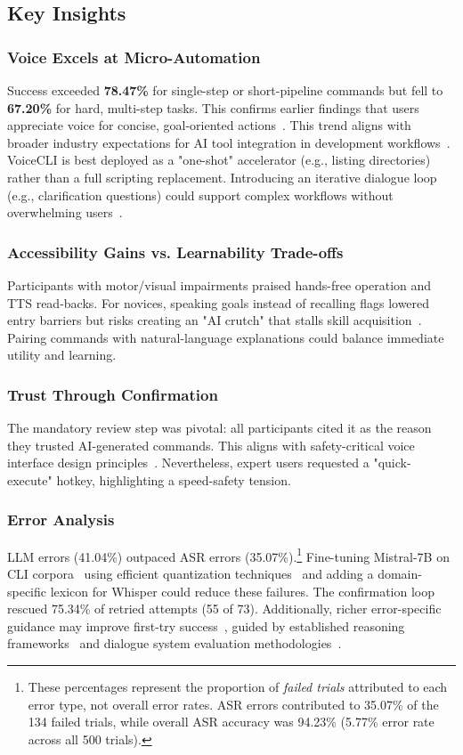 \documentclass[a4paper,12pt]{article}
\begin{document}
\subsection{Key Insights}

\subsubsection{Voice Excels at Micro-Automation}  
Success exceeded \textbf{78.47\%} for single-step or short-pipeline commands but fell to \textbf{67.20\%} for hard, multi-step tasks. This confirms earlier findings that users appreciate voice for concise, goal-oriented actions~\cite{ref4}. This trend aligns with broader industry expectations for AI tool integration in development workflows~\cite{ref2}. VoiceCLI is best deployed as a "one-shot" accelerator (e.g., listing directories) rather than a full scripting replacement. Introducing an iterative dialogue loop (e.g., clarification questions) could support complex workflows without overwhelming users~\cite{ref12}.  

\subsubsection{Accessibility Gains vs. Learnability Trade-offs}  
Participants with motor/visual impairments praised hands-free operation and TTS read-backs. For novices, speaking goals instead of recalling flags lowered entry barriers but risks creating an "AI crutch" that stalls skill acquisition~\cite{ref5,ref4}. Pairing commands with natural-language explanations could balance immediate utility and learning.  

\subsubsection{Trust Through Confirmation}  
The mandatory review step was pivotal: all participants cited it as the reason they trusted AI-generated commands. This aligns with safety-critical voice interface design principles~\cite{ref12}. Nevertheless, expert users requested a "quick-execute" hotkey, highlighting a speed-safety tension.  

\subsubsection{Error Analysis}  
LLM errors (41.04\%) outpaced ASR errors (35.07\%).\footnote{These percentages represent the proportion of \textit{failed trials} attributed to each error type, not overall error rates. ASR errors contributed to 35.07\% of the 134 failed trials, while overall ASR accuracy was 94.23\% (5.77\% error rate across all 500 trials).} Fine-tuning Mistral-7B on CLI corpora~\cite{ref5} using efficient quantization techniques~\cite{ref24} and adding a domain-specific lexicon for Whisper could reduce these failures. The confirmation loop rescued 75.34\% of retried attempts (55 of 73). Additionally, richer error-specific guidance may improve first-try success~\cite{ref4}, guided by established reasoning frameworks~\cite{ref19} and dialogue system evaluation methodologies~\cite{ref18}.
\end{document}
